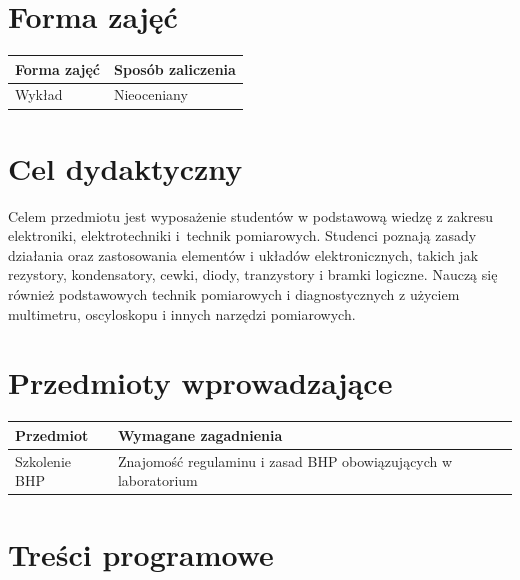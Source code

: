 \documentclass[12pt, a4paper]{article}
\begin{document}
\section{Forma zajęć}

\begin{tabular}{ll}
  \hline
  \textbf{Forma zajęć} & \textbf{Sposób zaliczenia} \\
  \hline
  Wykład & Nieoceniany \\
  \hline
\end{tabular}

\section{Cel dydaktyczny}

Celem przedmiotu jest wyposażenie studentów w podstawową wiedzę z zakresu elektroniki, elektrotechniki i technik pomiarowych. Studenci poznają zasady działania oraz zastosowania elementów i układów elektronicznych, takich jak rezystory, kondensatory, cewki, diody, tranzystory i bramki logiczne. Nauczą się również podstawowych technik pomiarowych i diagnostycznych z użyciem multimetru, oscyloskopu i innych narzędzi pomiarowych.

\section{Przedmioty wprowadzające}

\begin{tabularx}{\textwidth}{lX}
  \hline
  \textbf{Przedmiot} & \textbf{Wymagane zagadnienia} \\
  \hline
  [BHP] Szkolenie BHP & Znajomość regulaminu i zasad BHP obowiązujących w laboratorium \\
  \hline
\end{tabularx}

\section{Treści programowe}
\end{document}
